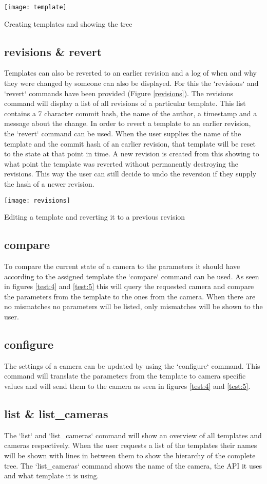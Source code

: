 \begin{marginfigure}
	\texttt{[image: template]}
	\caption{Creating templates and showing the tree}
	\label{template}
\end{marginfigure}

\subsection{revisions \& revert}
Templates can also be reverted to an earlier revision and a log of when and why they were changed by someone can also be displayed.
For this the `revisions` and `revert` commands have been provided (Figure \ref{revisions}).
The revisions command will display a list of all revisions of a particular template.
This list contains a 7 character commit hash, the name of the author, a timestamp and a message about the change.
In order to revert a template to an earlier revision, the `revert` command can be used.
When the user supplies the name of the template and the commit hash of an earlier revision, that template will be reset to the state at that point in time.
A new revision is created from this showing to what point the template was reverted without permanently destroying the revisions.
This way the user can still decide to undo the reversion if they supply the hash of a newer revision.

\begin{marginfigure}
	\texttt{[image: revisions]}
	\caption{Editing a template and reverting it to a previous revision}
	\label{revisions}
\end{marginfigure}

\subsection{compare}
To compare the current state of a camera to the parameters it should have according to the assigned template the `compare` command can be used.
As seen in figures \ref{test:4} and \ref{test:5} this will query the requested camera and compare the parameters from the template to the ones from the camera.
When there are no mismatches no parameters will be listed, only mismatches will be shown to the user.

\subsection{configure}
The settings of a camera can be updated by using the `configure` command.
This command will translate the parameters from the template to camera specific values and will send them to the camera as seen in figures \ref{test:4} and \ref{test:5}.

\subsection{list \& list\_cameras}
The `list` and `list\_cameras` command will show an overview of all templates and cameras respectively.
When the user requests a list of the templates their names will be shown with lines in between them to show the hierarchy of the complete tree.
The `list\_cameras` command shows the name of the camera, the API it uses and what template it is using.
